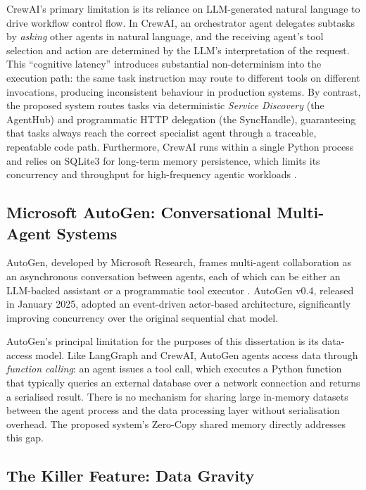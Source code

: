 \documentclass[12pt, a4paper]{report}
\begin{document}
CrewAI's primary limitation is its reliance on LLM-generated natural language to drive
workflow control flow. In CrewAI, an orchestrator agent delegates subtasks by
\emph{asking} other agents in natural language, and the receiving agent's tool selection
and action are determined by the LLM's interpretation of the request.
This ``cognitive latency'' introduces substantial non-determinism into the execution path:
the same task instruction may route to different tools on different invocations, producing
inconsistent behaviour in production systems.
By contrast, the proposed system routes tasks via deterministic \emph{Service Discovery}
(the AgentHub) and programmatic HTTP delegation (the SyncHandle), guaranteeing that
tasks always reach the correct specialist agent through a traceable, repeatable code path.
Furthermore, CrewAI runs within a single Python process and relies on SQLite3 for
long-term memory persistence, which limits its concurrency and throughput for
high-frequency agentic workloads \citep{agentframeworks2025empirical}.

\subsection{Microsoft AutoGen: Conversational Multi-Agent Systems}
\label{ssec:autogen}

AutoGen, developed by Microsoft Research, frames multi-agent collaboration as an
asynchronous conversation between agents, each of which can be either an LLM-backed
assistant or a programmatic tool executor \citep{wu2023autogen}.
AutoGen v0.4, released in January 2025, adopted an event-driven actor-based architecture,
significantly improving concurrency over the original sequential chat model.

AutoGen's principal limitation for the purposes of this dissertation is its
data-access model.
Like LangGraph and CrewAI, AutoGen agents access data through \emph{function calling}:
an agent issues a tool call, which executes a Python function that typically queries an
external database over a network connection and returns a serialised result.
There is no mechanism for sharing large in-memory datasets between the agent process and
the data processing layer without serialisation overhead.
The proposed system's Zero-Copy shared memory directly addresses this gap.

\subsection{The Killer Feature: Data Gravity}
\label{ssec:datagravity_mas}
\end{document}

